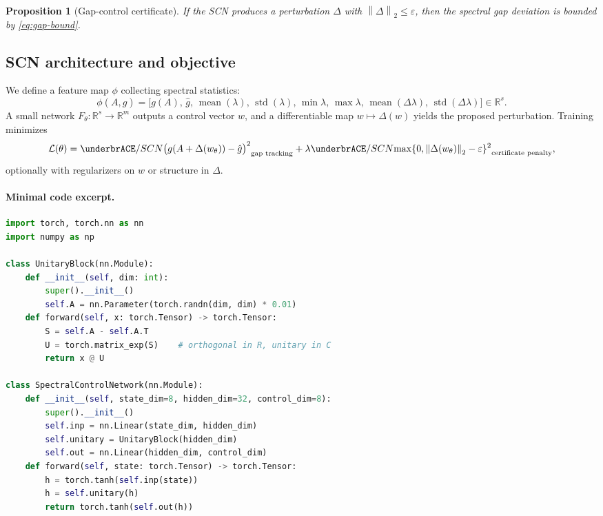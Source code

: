 \documentclass[11pt]{article}
\newtheorem{proposition}{Proposition}
\theoremstyle{definition}
\theoremstyle{remark}
\newcommand{\R}{\mathbb{R}}
\newcommand{\norm}[1]{\left\lVert #1 \right\rVert}
\begin{document}
\begin{proposition}[Gap-control certificate]
\label{prop:gap-certificate}
If the SCN produces a perturbation \(\Delta\) with \(\norm{\Delta}_2\le \varepsilon\), then the spectral gap deviation is bounded by \eqref{eq:gap-bound}. 
\end{proposition}

\subsection{SCN architecture and objective}
We define a feature map \(\phi\) collecting spectral statistics:
\[
  \phi(A,\hat g) = \big[g(A),\, \hat g,\, \operatorname{mean}(\lambda),\, \operatorname{std}(\lambda),\, \min \lambda,\, \max \lambda,\, \operatorname{mean}(\Delta\lambda),\, \operatorname{std}(\Delta\lambda)\big] \in \R^{s}.
\]
A small network \(F_\theta:\R^{s}\to\R^{m}\) outputs a control vector \(w\), and a differentiable map \(w\mapsto \Delta(w)\) yields the proposed perturbation. 
Training minimizes
\[
  \mathcal{L}(\theta) 
  = \underbrACE/SCN{\big(g(A+\Delta(w_\theta))-\hat g\big)^2}_{\text{gap tracking}}
  + \lambda \underbrACE/SCN{\max\{0,\norm{\Delta(w_\theta)}_2-\varepsilon\}^2}_{\text{certificate penalty}},
\]
optionally with regularizers on \(w\) or structure in \(\Delta\).

\paragraph{Minimal code excerpt.}
\begin{lstlisting}[language=Python,caption={Spectral Control Network (unitary block).}]
import torch, torch.nn as nn
import numpy as np

class UnitaryBlock(nn.Module):
    def __init__(self, dim: int):
        super().__init__()
        self.A = nn.Parameter(torch.randn(dim, dim) * 0.01)
    def forward(self, x: torch.Tensor) -> torch.Tensor:
        S = self.A - self.A.T
        U = torch.matrix_exp(S)    # orthogonal in R, unitary in C
        return x @ U

class SpectralControlNetwork(nn.Module):
    def __init__(self, state_dim=8, hidden_dim=32, control_dim=8):
        super().__init__()
        self.inp = nn.Linear(state_dim, hidden_dim)
        self.unitary = UnitaryBlock(hidden_dim)
        self.out = nn.Linear(hidden_dim, control_dim)
    def forward(self, state: torch.Tensor) -> torch.Tensor:
        h = torch.tanh(self.inp(state))
        h = self.unitary(h)
        return torch.tanh(self.out(h))
\end{lstlisting}
\end{document}
